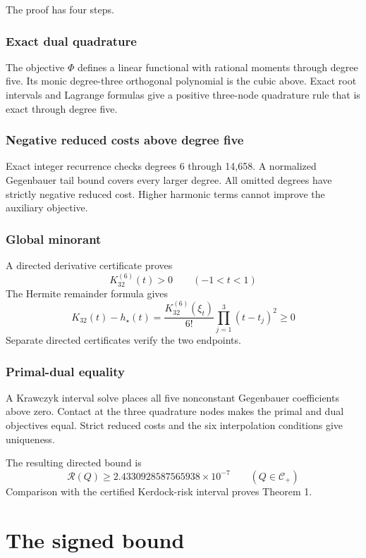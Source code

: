 \documentclass[11pt]{article}
\begin{document}
The proof has four steps.

\subsubsection{Exact dual quadrature}\label{exact-dual-quadrature}

The objective \(\Phi\) defines a linear functional with rational moments
through degree five. Its monic degree-three orthogonal polynomial is the
cubic above. Exact root intervals and Lagrange formulas give a positive
three-node quadrature rule that is exact through degree five.

\subsubsection{Negative reduced costs above degree
five}\label{negative-reduced-costs-above-degree-five}

Exact integer recurrence checks degrees 6 through 14,658. A normalized
Gegenbauer tail bound covers every larger degree. All omitted degrees
have strictly negative reduced cost. Higher harmonic terms cannot
improve the auxiliary objective.

\subsubsection{Global minorant}\label{global-minorant}

A directed derivative certificate proves \[
K_{32}^{(6)}(t)>0
\qquad (-1<t<1)
\] The Hermite remainder formula gives \[
K_{32}(t)-h_\star(t)
=\frac{K_{32}^{(6)}(\xi_t)}{6!}
\prod_{j=1}^{3}(t-t_j)^2
\geq0
\] Separate directed certificates verify the two endpoints.

\subsubsection{Primal-dual equality}\label{primal-dual-equality}

A Krawczyk interval solve places all five nonconstant Gegenbauer
coefficients above zero. Contact at the three quadrature nodes makes the
primal and dual objectives equal. Strict reduced costs and the six
interpolation conditions give uniqueness.

The resulting directed bound is \[
\mathcal{R}(Q)
\geq 2.4330928587565938\times10^{-7}
\qquad (Q\in\mathcal{C}_{+})
\] Comparison with the certified Kerdock-risk interval proves Theorem 1.

\section{The signed bound}\label{the-signed-bound}
\end{document}

